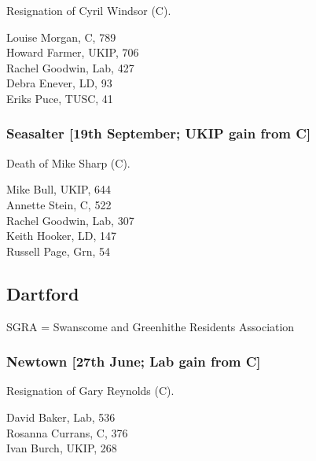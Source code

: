 \documentclass[a4paper,openany,10pt]{book}
\begin{document}

Resignation of Cyril Windsor (C).



Louise Morgan, C, 789\\
Howard Farmer, UKIP, 706\\
Rachel Goodwin, Lab, 427\\
Debra Enever, LD, 93\\
Eriks Puce, TUSC, 41\\


\subsubsection*{Seasalter \hspace*{\fill}\nolinebreak[1]%
\enspace\hspace*{\fill}
[19th September; UKIP gain from C]}


Death of Mike Sharp (C).



Mike Bull, UKIP, 644\\
Annette Stein, C, 522\\
Rachel Goodwin, Lab, 307\\
Keith Hooker, LD, 147\\
Russell Page, Grn, 54\\


\subsection*{Dartford}

SGRA = Swanscome and Greenhithe Residents Association

\subsubsection*{Newtown \hspace*{\fill}\nolinebreak[1]%
\enspace\hspace*{\fill}
[27th June; Lab gain from C]}


Resignation of Gary Reynolds (C).



David Baker, Lab, 536\\
Rosanna Currans, C, 376\\
Ivan Burch, UKIP, 268\\
\end{document}
